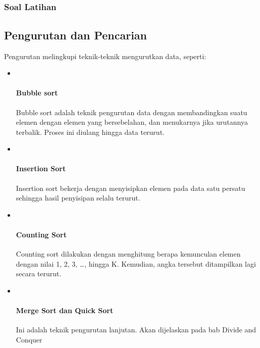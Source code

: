 \documentclass[]{article}
\let\oldparagraph\paragraph
\renewcommand{\paragraph}[1]{\oldparagraph{#1}\mbox{}}
\begin{document}
\subsection{}\label{rekomandasi-soal-soal-latihan}

\subsubsection{Soal Latihan}\label{soal-latihan-3}

\subsection{Pengurutan dan Pencarian}\label{pengurutan-dan-pencarian}

Pengurutan melingkupi teknik-teknik mengurutkan data, seperti:

\begin{itemize}
\item ~
  \paragraph{Bubble sort}\label{bubble-sort}

  Bubble sort adalah teknik pengurutan data dengan membandingkan suatu
  elemen dengan elemen yang bersebelahan, dan menukarnya jika urutannya
  terbalik. Proses ini diulang hingga data terurut.
\item ~
  \paragraph{Insertion Sort}\label{insertion-sort}

  Insertion sort bekerja dengan menyisipkan elemen pada data satu
  persatu sehingga hasil penyisipan selalu terurut.
\item ~
  \paragraph{Counting Sort}\label{counting-sort}

  Counting sort dilakukan dengan menghitung berapa kemunculan elemen
  dengan nilai 1, 2, 3, \ldots{}, hingga K. Kemudian, angka tersebut
  ditampilkan lagi secara terurut.
\item ~
  \paragraph{Merge Sort dan Quick Sort}\label{merge-sort-dan-quick-sort}

  Ini adalah teknik pengurutan lanjutan. Akan dijelaskan pada bab Divide
  and Conquer
\end{itemize}
\end{document}
